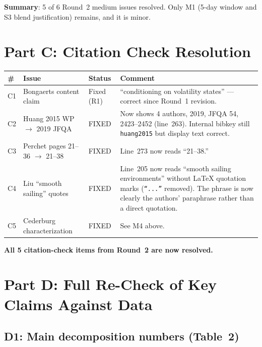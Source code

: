 \documentclass[12pt,a4paper]{article}
\begin{document}
\textbf{Summary}: 5 of 6 Round~2 medium issues resolved. Only M1 (5-day window and S3 blend justification) remains, and it is minor.

\section*{Part C: Citation Check Resolution}

\begin{longtable}{p{0.6cm}p{3cm}p{2cm}p{7.8cm}}
\toprule
\# & Issue & Status & Comment \\
\midrule
C1 & Bongaerts content claim & \textcolor{okgreen}{Fixed (R1)} & ``conditioning on volatility states'' --- correct since Round~1 revision. \\
\midrule
C2 & Huang 2015 WP $\to$ 2019 JFQA & \textcolor{okgreen}{FIXED} & Now shows 4 authors, 2019, JFQA 54, 2423--2452 (line~263). Internal bibkey still \texttt{huang2015} but display text correct. \\
\midrule
C3 & Perchet pages 21--36 $\to$ 21--38 & \textcolor{okgreen}{FIXED} & Line~273 now reads ``21--38.'' \\
\midrule
C4 & Liu ``smooth sailing'' quotes & \textcolor{okgreen}{FIXED} & Line~205 now reads ``smooth sailing environments'' without LaTeX quotation marks (\texttt{``...''} removed). The phrase is now clearly the authors' paraphrase rather than a direct quotation. \\
\midrule
C5 & Cederburg characterization & \textcolor{okgreen}{FIXED} & See M4 above. \\
\bottomrule
\end{longtable}

\textbf{All 5 citation-check items from Round~2 are now resolved.}

\section*{Part D: Full Re-Check of Key Claims Against Data}

\subsection*{D1: Main decomposition numbers (Table~2)}
\end{document}
